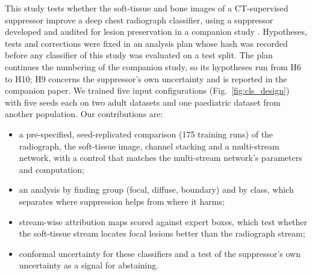 This study tests whether the soft-tissue and bone images of a CT-supervised suppressor improve a deep chest radiograph classifier, using a
suppressor developed and audited for lesion preservation in a companion study . Hypotheses,
tests and corrections were fixed in an analysis plan whose hash was recorded before any classifier of this study was evaluated on a test
split. The plan continues the numbering of the companion study, so its hypotheses run from H6 to H10; H9 concerns the suppressor's own
uncertainty and is reported in the companion paper. We trained five input configurations (Fig.~\ref{fig:cls_design}) with five seeds each on
two adult datasets and one paediatric dataset from another population. Our contributions are:
\begin{itemize}
\item a pre-specified, seed-replicated comparison (175 training runs) of the radiograph, the soft-tissue image, channel stacking and a
  multi-stream network, with a control that matches the multi-stream network's parameters and computation;
\item an analysis by finding group (focal, diffuse, boundary) and by class, which separates where suppression helps from where it harms;
\item stream-wise attribution maps scored against expert boxes, which test whether the soft-tissue stream locates focal lesions better
  than the radiograph stream;
\item conformal uncertainty for these classifiers and a test of the suppressor's own uncertainty as a signal for abstaining.
\end{itemize}
